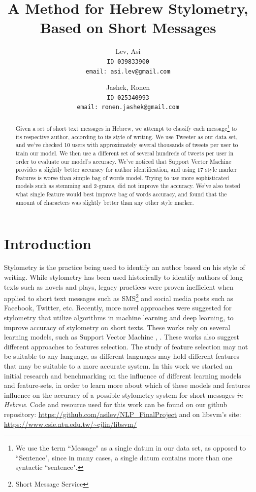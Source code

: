 \documentclass[a4paper]{article}
\author{Lev, Asi\\
	\texttt{ID 039833900}\\
	\texttt{email: asi.lev@gmail.com}
\and
	Jashek, Ronen\\
	\texttt{ID 025340993}\\
	\texttt{email: ronen.jashek@gmail.com}	
}
\title{A Method for Hebrew Stylometry, Based on Short Messages}
\date{}
\begin{document}
\maketitle
\begin{abstract}

Given a set of short text messages in Hebrew, we attempt to classify each message\footnote{We use the term ``Message" as a single datum in our data set, as opposed to ``Sentence", since in many cases, a single datum contains more than one syntactic ``sentence".} to its respective author, according to its style of writing.
We use Tweeter as our data set, and we've checked 10 users with approximately several thousands of tweets per user to train our model.
We then use a different set of several hundreds of tweets per user in order to evaluate our model's accuracy.
We've noticed that Support Vector Machine provides a slightly better accuracy for author identification, and using 17 style marker features is worse than simple bag of words model. Trying to use more sophisticated models such as stemming and 2-grams, did not improve the accuracy. We've also tested what single feature would best improve bag of words accuracy, and found that the amount of characters was slightly better than any other style marker.
\end{abstract}
\section{Introduction}

Stylometry is the practice being used to identify an author based on his style of writing.
While stylometry has been used historically to identify authors of long texts such as novels and plays, legacy practices were proven inefficient when applied to short text messages such as SMS\footnote{Short Message Service} and social media posts such as Facebook, Twitter, etc. \cite{rachel}
Recently, more novel approaches were suggested for stylometry that utilize algorithms in machine learning and deep learning, to improve accuracy of stylometry on short texts.
These works rely on several learning models, such as Support Vector Machine \cite{rachel}, \cite{schwartz}.
These works also suggest different approaches to features selection. The study of feature selection may not be suitable to any language, as different languages may hold different features that may be suitable to a more accurate system.
In this work we started an initial research and benchmarking on the influence of different learning models and feature-sets, in order to learn more about which of these models and features influence on the accuracy of a possible stylometry system for short messages \emph{in Hebrew}.
Code and resource used for this work can be found on our github repository: \url{https://github.com/asilev/NLP\_FinalProject} and on libsvm's site: \url{https://www.csie.ntu.edu.tw/~cjlin/libsvm/} \cite{chang}
\end{document}
